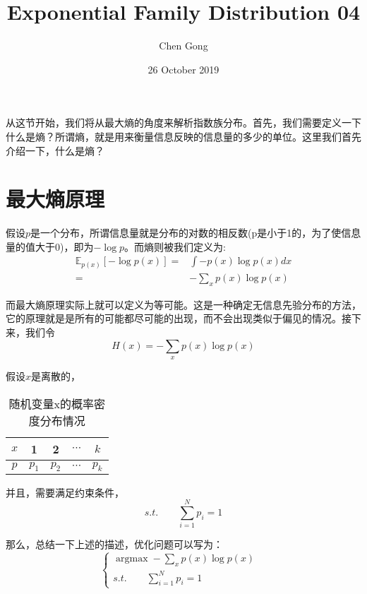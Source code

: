 \documentclass[a4paper]{article}
\title{Exponential Family Distribution 04}
\author{Chen Gong}
\date{26 October 2019}
\DeclareMathOperator*{\argmax}{argmax}
\begin{document}
\maketitle
从这节开始，我们将从最大熵的角度来解析指数族分布。首先，我们需要定义一下什么是熵？所谓熵，就是用来衡量信息反映的信息量的多少的单位。这里我们首先介绍一下，什么是熵？

\section{最大熵原理}
假设$p$是一个分布，所谓信息量就是分布的对数的相反数(p是小于1的，为了使信息量的值大于0)，即为$-\log p$。而熵则被我们定义为:
\begin{equation}
    \begin{split}
        \mathbb{E}_{p(x)}[-\log p(x)]= & \int -p(x)\log p(x) dx \\
        = & - \sum_{x} p(x)\log p(x)
    \end{split}
\end{equation}

而最大熵原理实际上就可以定义为等可能。这是一种确定无信息先验分布的方法，它的原理就是是所有的可能都尽可能的出现，而不会出现类似于偏见的情况。接下来，我们令
\begin{equation}
    H(x)=-\sum_x p(x)\log p(x)
\end{equation}

假设$x$是离散的，
\begin{table}[H]
    \centering
    \begin{tabular}{c|cccc}
         $x$ & 1 & 2 & $\cdots$ & $k$ \\
         \hline
         $p$ & $p_1$ & $p_2$ & $\cdots$ & $p_k$ \\ 
    \end{tabular}
    \caption{随机变量x的概率密度分布情况}
    \label{tab:my_label}
\end{table}

并且，需要满足约束条件，
\begin{equation}
    s.t. \qquad \sum_{i=1}^Np_i=1
\end{equation}

那么，总结一下上述的描述，优化问题可以写为：
\begin{equation}
    \left\{
    \begin{array}{ll}
         \mathop{\argmax} -\sum_x p(x)\log p(x) & \\
         s.t. \qquad \sum_{i=1}^Np_i=1 &
    \end{array}
    \right.
\end{equation}
\end{document}
